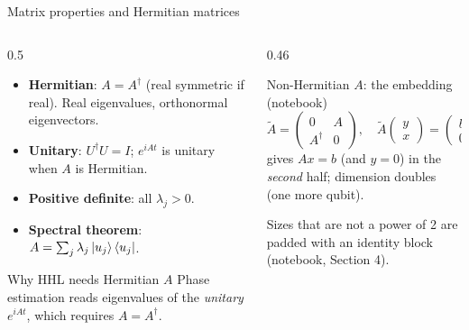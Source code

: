 \documentclass[aspectratio=169,11pt]{beamer}
\newcommand{\key}[1]{{\color{qdark}\textbf{#1}}}
\begin{document}
\begin{frame}{Matrix properties and Hermitian matrices}
  \begin{columns}[T]
    \begin{column}{0.5\textwidth}
      \small
      \begin{itemize}
        \item \key{Hermitian}: $A = A^\dagger$ (real symmetric if real). Real eigenvalues, orthonormal eigenvectors.
        \item \key{Unitary}: $U^\dagger U = I$; $e^{iAt}$ is unitary when $A$ is Hermitian.
        \item \key{Positive definite}: all $\lambda_j > 0$.
        \item \key{Spectral theorem}: $A = \sum_j\lambda_j\ket{u_j}\bra{u_j}$.
      \end{itemize}
      \begin{block}{Why HHL needs Hermitian $A$}
        Phase estimation reads eigenvalues of the \emph{unitary} $e^{iAt}$, which requires $A = A^\dagger$.
      \end{block}
    \end{column}
    \begin{column}{0.46\textwidth}
      \begin{block}{Non-Hermitian $A$: the embedding (notebook)}
        \[ \tilde A = \begin{pmatrix}0 & A\\ A^\dagger & 0\end{pmatrix},\quad \tilde A\begin{pmatrix}y\\ x\end{pmatrix} = \begin{pmatrix}b\\ 0\end{pmatrix} \]
        gives $Ax = b$ (and $y = 0$) in the \emph{second} half; dimension doubles (one more qubit).
      \end{block}
      \small Sizes that are not a power of 2 are padded with an identity block (notebook, Section 4).
    \end{column}
  \end{columns}
\end{frame}
\end{document}
